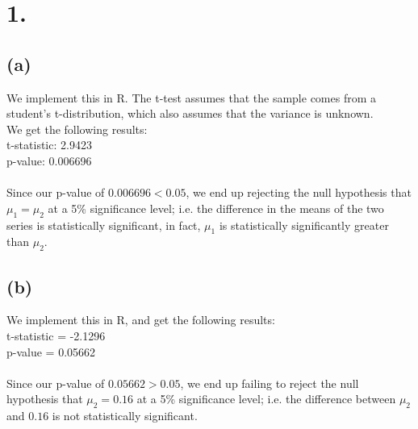 \documentclass{article}
\begin{document}
\thispagestyle{firstpageheader}

\section*{1.}
{\Large 

\subsection*{(a)}

We implement this in R. The t-test assumes that the sample comes from a student's t-distribution, which also assumes that the variance is unknown.
\\
We get the following results: \\ 
t-statistic: 2.9423 \\
p-value: 0.006696 \\ \\
Since our p-value of $0.006696 < 0.05$, we end up rejecting the null hypothesis that $\mu_1 = \mu_2$ at a 5\% significance level; i.e. the difference in the means of the two series is statistically significant, in fact, $\mu_1$ is statistically significantly greater than $\mu_2$.

\subsection*{(b)}

We implement this in R, and get the following results: \\ 
t-statistic = -2.1296 \\
p-value = 0.05662 \\ \\ 
Since our p-value of $0.05662 > 0.05$, we end up failing to reject the null hypothesis that $\mu_2 = 0.16$ at a 5\% significance level; i.e. the difference between $\mu_2$ and $0.16$ is not statistically significant.
\newpage

}
\end{document}
